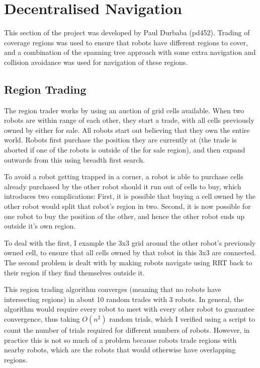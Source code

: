 \documentclass[10pt,a4paper]{article}
\begin{document}
\twocolumn


\section{Decentralised Navigation}
This section of the project was developed by Paul Durbaba (pd452). Trading of coverage regions was used to ensure that robots have different regions to cover, and a combination of the spanning tree approach with some extra navigation and collision avoidance was used for navigation of these regions.

\subsection{Region Trading}
The region trader works by using an auction of grid cells available. When two robots are within range of each other, they start a trade, with all cells previously owned by either for sale. All robots start out believing that they own the entire world. Robots first purchase the position they are currently at (the trade is aborted if one of the robots is outside of the for sale region), and then expand outwards from this using breadth first search.

To avoid a robot getting trapped in a corner, a robot is able to purchase cells already purchased by the other robot should it run out of cells to buy, which introduces two complications: First, it is possible that buying a cell owned by the other robot would split that robot's region in two. Second, it is now possible for one robot to buy the position of the other, and hence the other robot ends up outside it's own region.

To deal with the first, I example the 3x3 grid around the other robot's previously owned cell, to ensure that all cells owned by that robot in this 3x3 are connected. The second problem is dealt with by making robots navigate using RRT back to their region if they find themselves outside it.

This region trading algorithm converges (meaning that no robots have intersecting regions) in about 10 random trades with 3 robots. In general, the algorithm would require every robot to meet with every other robot to guarantee convergence, thus taking $O(n^2)$ random trials, which I verified using a script to count the number of trials required for different numbers of robots. However, in practice this is not so much of a problem because robots trade regions with nearby robots, which are the robots that would otherwise have overlapping regions.
\end{document}

